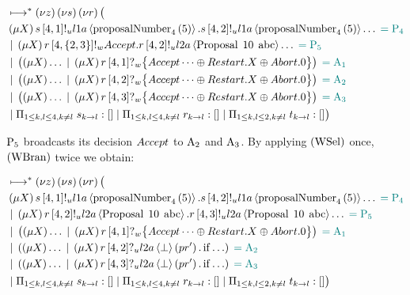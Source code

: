 \begin{align*}
&\mapstostar \NuChannels \big (\\
&\Mu{\RecursionVariable} \SendUnreliableP{s}{4}{1}{\LOneA}{\proposalNumber{5}{4}}.\SendUnreliableP{s}{4}{2}{\LOneA}{\proposalNumber{5}{4}}\dots \comment{= \Proposer{4}}\\
&\Or \Mu{\RecursionVariable} \SendWeaklyP{r}{4}{\Curly{2,3}}{\Accept}{\SendUnreliableP{r}{4}{2}{\LTwoA}{\ProposalC{10}{\ABC}}}\dots \comment{= \Proposer{5}}\\
&\Or \Paren{
    \Mu{\RecursionVariable} \dots
    \Or \Mu{\RecursionVariable} \ReceiveWeaklyP{r}{4}{1}{\BeginPaCont}
} \comment{= \Acceptor{1}}\\
&\Or \Paren{
    \Mu{\RecursionVariable} \dots
    \Or \Mu{\RecursionVariable} \ReceiveWeaklyP{r}{4}{2}{\BeginPaCont}
} \comment{= \Acceptor{2}}\\
&\Or \Paren{
    \Mu{\RecursionVariable} \dots
    \Or \Mu{\RecursionVariable} \ReceiveWeaklyP{r}{4}{3}{\BeginPaCont}
} \comment{= \Acceptor{3}}\\
&\Or \InnerSessionQueues{s}
\Or \InnerSessionQueues{r}
\Or \OuterSessionQueues
\big )
\end{align*}

$\Proposer{5}$ broadcasts its decision $\Accept$ to $\Acceptor{2}$ and $\Acceptor{3}$.
By applying $\RWsel$ once, $\RWbran$ twice we obtain:

\begin{align*}
&\mapstostar \NuChannels \big (\\
&\Mu{\RecursionVariable} \SendUnreliableP{s}{4}{1}{\LOneA}{\proposalNumber{5}{4}}.\SendUnreliableP{s}{4}{2}{\LOneA}{\proposalNumber{5}{4}}\dots \comment{= \Proposer{4}}\\
&\Or \Mu{\RecursionVariable} \SendUnreliableP{r}{4}{2}{\LTwoA}{\ProposalC{10}{\ABC}}.\SendUnreliableP{r}{4}{3}{\LTwoA}{\ProposalC{10}{\ABC}}\dots \comment{= \Proposer{5}}\\
&\Or \Paren{
    \Mu{\RecursionVariable} \dots
    \Or \Mu{\RecursionVariable} \ReceiveWeaklyP{r}{4}{1}{\BeginPaCont}
} \comment{= \Acceptor{1}}\\
&\Or \Paren{
    \Mu{\RecursionVariable} \dots
    \Or \Mu{\RecursionVariable} \ReceiveUnreliableP{r}{4}{2}{\LTwoA}{\bot}{pr'}.\If{\dots}
} \comment{= \Acceptor{2}}\\
&\Or \Paren{
    \Mu{\RecursionVariable} \dots
    \Or \Mu{\RecursionVariable} \ReceiveUnreliableP{r}{4}{3}{\LTwoA}{\bot}{pr'}.\If{\dots}
} \comment{= \Acceptor{3}}\\
&\Or \InnerSessionQueues{s}
\Or \InnerSessionQueues{r}
\Or \OuterSessionQueues
\big )
\end{align*}


